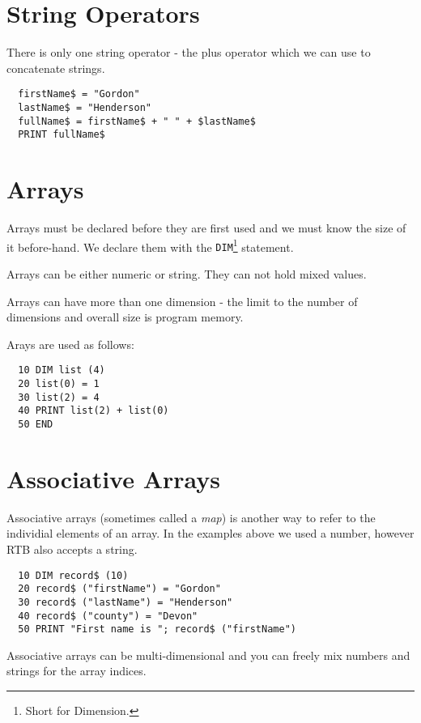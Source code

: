 \section{String Operators}
There is only one string operator - the plus operator which we can use
to concatenate strings.
\begin{verbatim}
  firstName$ = "Gordon"
  lastName$ = "Henderson"
  fullName$ = firstName$ + " " + $lastName$
  PRINT fullName$
\end{verbatim}

\section{Arrays}
Arrays must be declared before they are first used and we must know the
size of it before-hand. We declare them with the {\tt DIM}\footnote{Short
for Dimension.} statement.

Arrays can be either numeric or string.  They can not hold mixed values.

Arrays can have more than one dimension - the limit to the number
of dimensions and overall size is program memory.

Arays are used as follows:
\begin{verbatim}
  10 DIM list (4)
  20 list(0) = 1
  30 list(2) = 4
  40 PRINT list(2) + list(0)
  50 END
\end{verbatim}

\section{Associative Arrays}
Associative arrays (sometimes called a {\em map}) is another way to
refer to the individial elements of an array. In the examples above we
used a number, however RTB also accepts a string.
\begin{verbatim}
  10 DIM record$ (10)
  20 record$ ("firstName") = "Gordon"
  30 record$ ("lastName") = "Henderson"
  40 record$ ("county") = "Devon"
  50 PRINT "First name is "; record$ ("firstName")
\end{verbatim}
Associative arrays can be multi-dimensional and you can freely mix
numbers and strings for the array indices.
